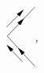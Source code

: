 \[\begin{gathered}
\begin{tikzpicture}[x=0.75pt,y=0.75pt,yscale=-0.8,xscale=0.8]
        \draw    (267,160) -- (309,115.21) ;
        \draw [shift={(292.79,132.5)}, rotate = 133.16] [fill={rgb, 255:red, 0; green, 0; blue, 0 }  ][line width=0.08]  [draw opacity=0] (12,-3) -- (0,0) -- (12,3) -- cycle    ;
        \draw    (309,206.21) -- (267,160) ;
        \draw [shift={(283.29,177.92)}, rotate = 47.73] [fill={rgb, 255:red, 0; green, 0; blue, 0 }  ][line width=0.08]  [draw opacity=0] (12,-3) -- (0,0) -- (12,3) -- cycle    ;
        \draw    (266,146) -- (290.61,120.64) ;
        \draw [shift={(292,119.21)}, rotate = 134.14] [fill={rgb, 255:red, 0; green, 0; blue, 0 }  ][line width=0.08]  [draw opacity=0] (12,-3) -- (0,0) -- (12,3) -- cycle    ;
        \draw    (267.35,174.47) -- (290,199.21) ;
        \draw [shift={(266,173)}, rotate = 47.52] [fill={rgb, 255:red, 0; green, 0; blue, 0 }  ][line width=0.08]  [draw opacity=0] (12,-3) -- (0,0) -- (12,3) -- cycle    ;
        \end{tikzpicture}
\end{gathered},
\]
